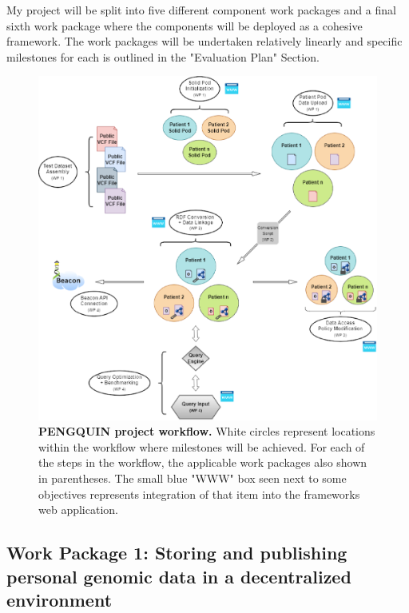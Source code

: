 \documentclass[runningheads]{llncs}
\begin{document}
My project will be split into five different component work packages and a final sixth work package where the components will be deployed as a cohesive framework. 
The work packages will be undertaken relatively linearly and specific milestones for each is outlined in the "Evaluation Plan" Section.

\begin{figure}
\includegraphics[width=\textwidth]{fig1.eps}
\caption{\textbf{PENGQUIN project workflow.}
White circles represent locations within the workflow where milestones will be achieved. 
For each of the steps in the workflow, the applicable work packages also shown in parentheses. 
The small blue "WWW" box seen next to some objectives represents integration of that item into the framework\textquotesingle s web application.
} \label{fig1}
\end{figure}

\subsection{Work Package 1: Storing and publishing personal genomic data in a decentralized environment} 
\end{document}
